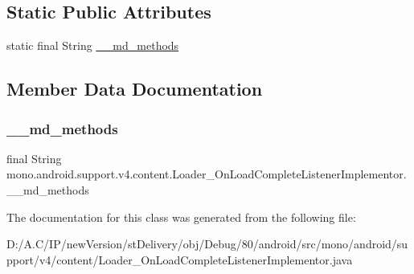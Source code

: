 \subsection*{Static Public Attributes}
\begin{DoxyCompactItemize}
\item 
static final String \hyperlink{classmono_1_1android_1_1support_1_1v4_1_1content_1_1_loader___on_load_complete_listener_implementor_ac414db5d27d8036b3792eef1cc8344f8}{\+\_\+\+\_\+md\+\_\+methods}
\end{DoxyCompactItemize}


\subsection{Member Data Documentation}
\mbox{\label{classmono_1_1android_1_1support_1_1v4_1_1content_1_1_loader___on_load_complete_listener_implementor_ac414db5d27d8036b3792eef1cc8344f8}} 
\subsubsection{\texorpdfstring{\+\_\+\+\_\+md\+\_\+methods}{\_\_md\_methods}}
{\footnotesize\ttfamily final String mono.\+android.\+support.\+v4.\+content.\+Loader\+\_\+\+On\+Load\+Complete\+Listener\+Implementor.\+\_\+\+\_\+md\+\_\+methods\hspace{0.3cm}{\ttfamily [static]}}



The documentation for this class was generated from the following file\+:\begin{DoxyCompactItemize}
\item 
D\+:/\+A.\+C/\+I\+P/new\+Version/st\+Delivery/obj/\+Debug/80/android/src/mono/android/support/v4/content/Loader\+\_\+\+On\+Load\+Complete\+Listener\+Implementor.\+java\end{DoxyCompactItemize}
